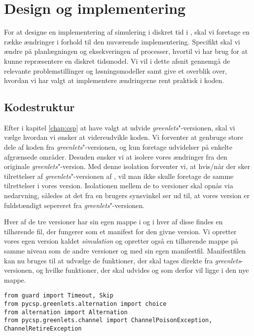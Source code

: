 
\section{Design og implementering}
For at designe en implementering af simulering i diskret tid i \pycsp, skal vi foretage en række ændringer i forhold til den nuværende implementering. Specifikt skal vi ændre på planlægningen og eksekveringen af processer, hvortil vi har brug for at kunne repræsentere en diskret tidsmodel. Vi vil i dette afsnit gennemgå de relevante problemstillinger og løsningsmodeller samt give et overblik over, hvordan vi har valgt at implementere ændringerne rent praktisk i koden. 


\subsection{Kodestruktur}  
Efter i kapitel \ref{chap:csp} at have valgt at udvide \emph{greenlets}"-versionen, skal vi vælge hvordan vi ønsker at videreudvikle koden. Vi forventer at genbruge store dele af koden fra \emph{greenlets}"-versionen, og kun foretage udvidelser på enkelte afgrænsede områder. Desuden ønsker vi at isolere vores ændringer fra den originale \emph{greenlets}"-version. Med denne isolation forventer vi, at hvis/når der sker tilrettelser af \emph{greenlets}"-versionen af \pycsp, vil man ikke skulle foretage de samme tilrettelser i vores version. 
Isolationen mellem de to versioner skal opnås via nedarvning, således at det fra en brugers synsvinkel ser ud til, at vores version er fuldstændigt sepereret fra \emph{greenlets}"-versionen.

Hver af de tre versioner har sin egen mappe i \pycsp og i hver af disse findes en tilhørende  fil, der fungerer som et manifest for den givne version. Vi opretter vores egen version kaldet \emph{simulation} og opretter også en tilhørende mappe på samme niveau som de andre versioner og med sin egen manifestfil. Manifestfilen kan nu bruges til at udvælge de funktioner, der skal tages direkte fra \emph{greenlets}-versionen, og hvilke funktioner, der skal udvides og som derfor vil ligge i den nye mappe.

\begin{lstlisting}[float=hbtp,label=fig:init,caption=Uddrag af \code{\_\_init\_\_.py} for simulationsversionen.]
from guard import Timeout, Skip
from pycsp.greenlets.alternation import choice
from alternation import Alternation
from pycsp.greenlets.channel import ChannelPoisonException, ChannelRetireException
\end{lstlisting}

